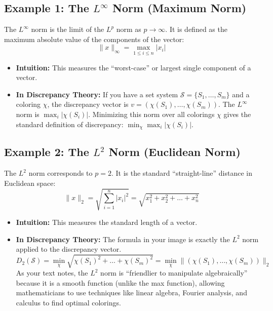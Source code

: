 \documentclass[11pt]{article}
\begin{document}
\subsection{Example 1: The \(L^\infty\) Norm (Maximum Norm)}

The \(L^\infty\) norm is the limit of the \(L^p\) norm as
\(p \to \infty\). It is defined as the maximum absolute value of the
components of the vector:
\[
  \|x\|_\infty = \max_{1 \le i \le n} |x_i|
\]

\begin{itemize}
  \item \textbf{Intuition:} This measures the ``worst-case'' or largest
        single component of a vector.
  \item \textbf{In Discrepancy Theory:} If you have a
        set system \(\mathcal{S} = \{S_1, \dots, S_m\}\) and a coloring
        \(\chi\), the discrepancy vector is
        \(v = (\chi(S_1), \dots, \chi(S_m))\).
        The \(L^\infty\) norm is \(\max_i |\chi(S_i)|\). Minimizing
        this norm over all colorings \(\chi\) gives the standard
        definition of discrepancy:
        \(\min_\chi \max_i |\chi(S_i)|\).
\end{itemize}

\subsection{Example 2: The \(L^2\) Norm (Euclidean Norm)}

The \(L^2\) norm corresponds to \(p=2\). It is the standard
``straight-line'' distance in Euclidean space:
\[
  \|x\|_2 = \sqrt{ \sum_{i=1}^n |x_i|^2 }
          = \sqrt{x_1^2 + x_2^2 + \dots + x_n^2}
\]

\begin{itemize}
  \item \textbf{Intuition:} This measures the standard length of a
        vector.
  \item \textbf{In Discrepancy Theory:} The formula in your image is exactly the \(L^2\) norm applied to the
        discrepancy vector.
        \[
          D_2(\mathcal{S})
          = \min_\chi \sqrt{\chi(S_1)^2 + \dots + \chi(S_m)^2}
          = \min_\chi \bigl\| (\chi(S_1), \dots, \chi(S_m)) \bigr\|_2
        \]
        As your text notes, the \(L^2\) norm is ``friendlier to
        manipulate algebraically'' because it is a smooth function
        (unlike the max function), allowing mathematicians to use
        techniques like linear algebra, Fourier analysis, and calculus
        to find optimal colorings.
\end{itemize}
\end{document}
